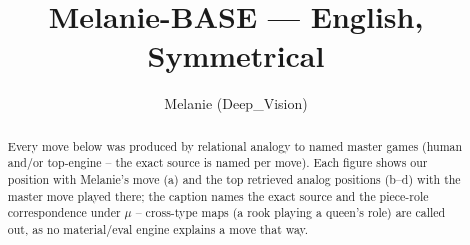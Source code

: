 \documentclass[11pt]{article}
\title{Melanie-BASE — English, Symmetrical}
\author{Melanie (Deep\_Vision)}
\date{}
\begin{document}
\maketitle

\begin{abstract}Every move below was produced by relational analogy to named master games (human and/or top-engine -- the exact source is named per move). Each figure shows our position with Melanie's move (a) and the top retrieved analog positions (b--d) with the master move played there; the caption names the exact source and the piece-role correspondence under $\mu$ -- cross-type maps (a rook playing a queen's role) are called out, as no material/eval engine explains a move that way.\end{abstract}

\begin{figure}[p]\centering
\begin{subfigure}{0.46\textwidth}\centering
\resizebox{\linewidth}{!}{%
\newchessgame
\chessboard[
  setfen={r1bq1rk1/pp1pppbp/2n2np1/2p5/2P4P/2N2NP1/PP1PPPB1/R1BQ1RK1 b - - 0 7},
  showmover=false,
  pgfstyle=straightmove, color=movearrow, markmove={a8-b8}
]}
\caption{}
\end{subfigure}\hfill
\begin{subfigure}{0.46\textwidth}\centering
\resizebox{\linewidth}{!}{%
\newchessgame
\chessboard[
  setfen={r1bq1rk1/pp2ppbp/2np1np1/2p5/2P5/P1N2NP1/1P1PPPBP/R1BQ1RK1 w - - 1 8},
  showmover=false,
  pgfstyle=straightmove, color=movearrow, markmove={a1-b1}
]}
\caption{}
\end{subfigure}
\\[4pt]
\begin{subfigure}{0.46\textwidth}\centering
\resizebox{\linewidth}{!}{%
\newchessgame
\chessboard[
  setfen={r1bq1rk1/pp2ppbp/2np1np1/2p5/2P5/P1N2NP1/1P1PPPBP/R1BQ1RK1 w - - 1 8},
  showmover=false,
  pgfstyle=straightmove, color=movearrow, markmove={a1-b1}
]}
\caption{}
\end{subfigure}\hfill
\begin{subfigure}{0.46\textwidth}\centering
\resizebox{\linewidth}{!}{%
\newchessgame
\chessboard[
  setfen={r1bq1rk1/1pppppbp/p1n2np1/8/2PP4/2N2NP1/PP2PPBP/R1BQ1RK1 b - - 0 7},
  showmover=false,
  pgfstyle=straightmove, color=movearrow, markmove={a8-b8}
]}
\caption{}
\end{subfigure}

\end{figure}
\end{document}
